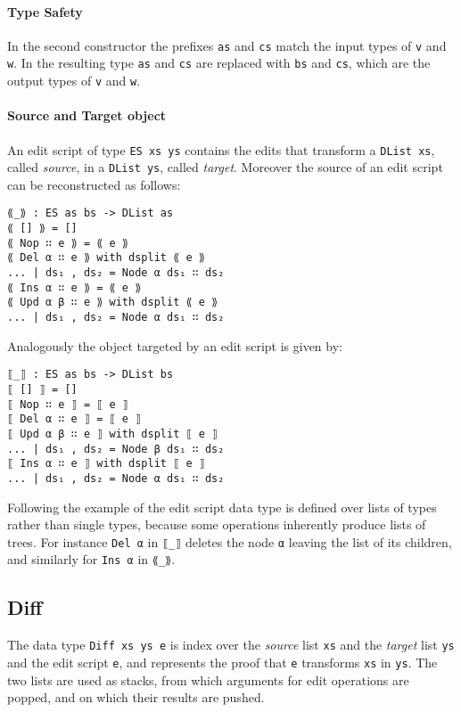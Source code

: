 \documentclass[../Thesis.tex]{subfiles}
\begin{document}
	\paragraph{Type Safety}
	In the second constructor the prefixes \texttt{as} and \texttt{cs} match
	the input types of \texttt{v} and \texttt{w}.
	In the resulting type \texttt{as} and \texttt{cs} are replaced with
	\texttt{bs} and \texttt{cs}, which are the output types of 
	\texttt{v} and \texttt{w}.
	
	\paragraph{Source and Target object}
	An edit script of type \texttt{ES xs ys} contains the edits
	that transform a \texttt{DList xs}, called \emph{source}, 
	in a \texttt{DList ys}, called \emph{target}. 
	Moreover the source of an edit script can be reconstructed as follows:
		
\begin{verbatim}
⟪_⟫ : ES as bs -> DList as
⟪ [] ⟫ = []
⟪ Nop ∷ e ⟫ = ⟪ e ⟫
⟪ Del α ∷ e ⟫ with dsplit ⟪ e ⟫
... | ds₁ , ds₂ = Node α ds₁ ∷ ds₂
⟪ Ins α ∷ e ⟫ = ⟪ e ⟫
⟪ Upd α β ∷ e ⟫ with dsplit ⟪ e ⟫
... | ds₁ , ds₂ = Node α ds₁ ∷ ds₂
\end{verbatim}

Analogously the object targeted by an edit script is given by:

\begin{verbatim}
⟦_⟧ : ES as bs -> DList bs
⟦ [] ⟧ = []
⟦ Nop ∷ e ⟧ = ⟦ e ⟧
⟦ Del α ∷ e ⟧ = ⟦ e ⟧
⟦ Upd α β ∷ e ⟧ with dsplit ⟦ e ⟧
... | ds₁ , ds₂ = Node β ds₁ ∷ ds₂
⟦ Ins α ∷ e ⟧ with dsplit ⟦ e ⟧
... | ds₁ , ds₂ = Node α ds₁ ∷ ds₂
\end{verbatim}

Following the example of \cite{Lemp09} the edit script
data type is defined over lists of types rather than single types, because 
some operations inherently produce lists of trees.
For instance \texttt{Del α} in \texttt{⟦\_⟧} deletes the node \texttt{α} 
leaving the list of its children, and similarly for \texttt{Ins α} in \texttt{⟪\_⟫}.

	\subsection{Diff}	
	\label{subsec:Diff}
	The data type \texttt{Diff xs ys e} is index over the \emph{source}  list 
	\texttt{xs} and the \emph{target} list \texttt{ys} and the edit script 
	\texttt{e},  and represents the proof that \texttt{e} transforms \texttt{xs} 	in \texttt{ys}.
	The two lists are used as stacks, from which arguments for 
	edit operations are popped, and on which their results are pushed.
\end{document}
